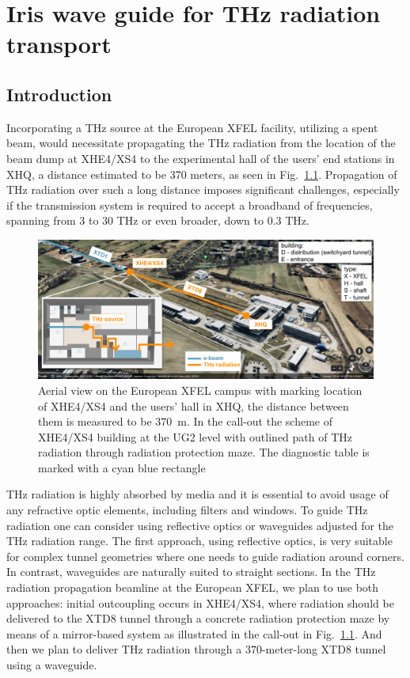 \chapter{Iris wave guide for THz radiation transport}

    \section{Introduction}
    Incorporating a THz source at the European XFEL facility, utilizing a spent beam, would necessitate propagating the THz radiation from the location of the beam dump at XHE4/XS4 to the experimental hall of the users' end stations in XHQ, a distance estimated to be 370 meters, as seen in Fig.~\ref{Fig:transport outline}. Propagation of THz radiation over such a long distance imposes significant challenges, especially if the transmission system is required to accept a broadband of frequencies, spanning from $3$ to $30$ THz or even broader, down to $0.3$ THz.
    
    \begin{figure}[h!]
    	\centering
    		\includegraphics[width=0.99\linewidth]{content/images/transport/aerial_view.pdf}
    		\centering
            \captionsetup{justification=centering}
        	\caption{Aerial view on the European XFEL campus with marking location of XHE4/XS4 and the users' hall in XHQ, the distance between them is measured to be $370$~m. In the call-out the scheme of XHE4/XS4 building at the UG2 level with outlined path of THz radiation through radiation protection maze. The diagnostic table is marked with a cyan blue rectangle}
        \label{Fig:transport outline}
    \end{figure}
    
    THz radiation is highly absorbed by media and it is essential to avoid usage of any refractive optic elements, including filters and windows. To guide THz radiation one can consider using reflective optics or waveguides adjusted for the THz radiation range. The first approach, using reflective optics, is very suitable for complex tunnel geometries where one needs to guide radiation around corners. In contrast, waveguides are naturally suited to straight sections. In the THz radiation propagation beamline at the European XFEL, we plan to use both approaches: initial outcoupling occurs in XHE4/XS4, where radiation should be delivered to the XTD8 tunnel through a concrete radiation protection maze by means of a mirror-based system as illustrated in  the call-out in Fig.~\ref{Fig:transport outline}. And then we plan to deliver THz radiation through a $370$-meter-long XTD8 tunnel using a waveguide.
    
